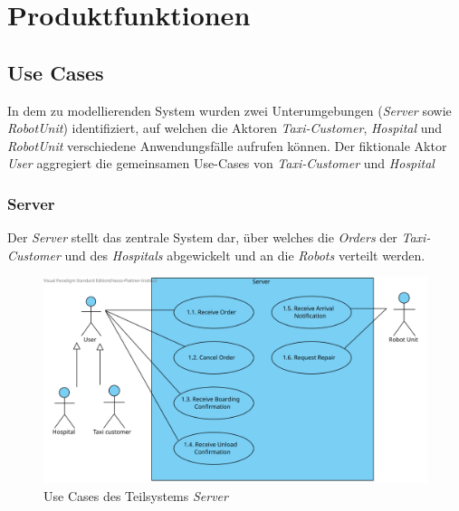 \section{Produktfunktionen}

		\subsection{Use Cases}

		In dem zu modellierenden System wurden zwei Unterumgebungen (\emph{Server} sowie \emph{RobotUnit}) identifiziert, auf welchen die Aktoren \emph{Taxi-Customer}, \emph{Hospital} und \emph{RobotUnit} verschiedene Anwendungsfälle aufrufen können. Der fiktionale Aktor \emph{User} aggregiert die gemeinsamen Use-Cases von \emph{Taxi-Customer} und \emph{Hospital} \\
			\subsubsection{Server}
			Der \emph{Server} stellt das zentrale System dar, über welches die \emph{Orders} der \emph{Taxi-Customer} und des \emph{Hospitals} abgewickelt und an die \emph{Robots} verteilt werden.
				\begin{figure}[H]
					\centering
					\includegraphics[width=1.0\textwidth]{img/2-Analyse-Server}
					\caption{Use Cases des Teilsystems \emph{Server}}
					\label{fig:3-1-server-use-cases}
				\end{figure}
			\pagebreak
